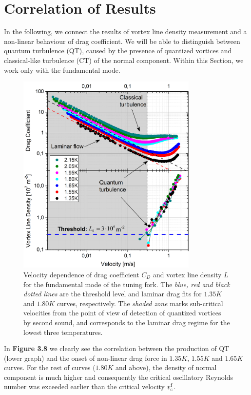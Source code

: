 \section{Correlation of Results}


In the following, we connect the results of vortex line density measurement and a non-linear behaviour of drag coefficient. We will be able to distinguish between quantum turbulence (QT), caused by the presence of quantized vortices and classical-like turbulence (CT) of the normal component. Within this Section, we work only with the fundamental mode.


\begin{figure}[h!]
	\centering
	\includegraphics[width=0.8\textwidth]{graphs/Merged_C+L_fund}
	\caption{Velocity dependence of drag coefficient $ C_D $ and vortex line density $ L $ for the fundamental mode of the tuning fork. The \textit{blue, red and black dotted lines} are the threshold level and laminar drag fits for $ 1.35\unit{K} $ and $ 1.80\unit{K} $ curves, respectively. The \textit{shaded zone} marks sub-critical velocities from the point of view of detection of quantized vortices by second sound, and corresponds to the laminar drag regime for the lowest three temperatures.}
\end{figure}


In {\sffamily\textbf{Figure 3.8}} we clearly see the correlation between the production of QT (lower graph) and the onset of non-linear drag force in $ 1.35\unit{K} $, $ 1.55\unit{K} $ and $ 1.65\unit{K} $ curves. For the rest of curves ($ 1.80 \unit{K} $ and above), the density of normal component is much higher and consequently the critical oscillatory Reynolds number was exceeded earlier than the critical velocity $v_{\mathrm{c}}^{\mathrm{f}}$.

